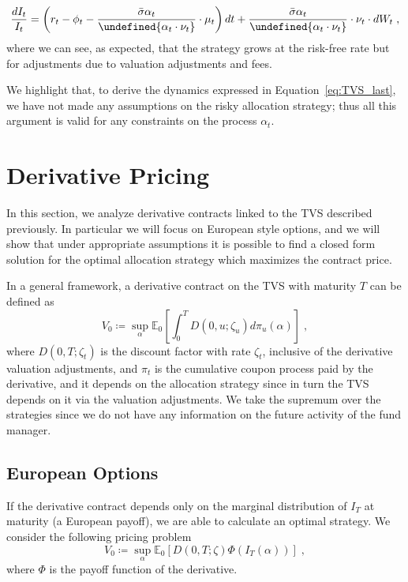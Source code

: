 \documentclass[11pt]{article}
\let\norm\undefined %
\DeclarePairedDelimiter\norm{\lVert}{\rVert}
\begin{document}
\begin{equation}
     \frac{dI_t}{I_t} = \left(r_t -  \phi_t     - \frac{\bar{\sigma} \alpha_t}{\norm {\alpha_t \cdot \nu_t }}  \cdot \mu_t \right)dt+ \frac{\bar{\sigma}\alpha_t }{\norm{ \alpha_t \cdot \nu_t }} \cdot \nu_t \cdot dW_t \; ,
\label{eq:TVS_last}\end{equation}
where we can see, as expected, that the strategy grows at the risk-free rate but for adjustments due to valuation adjustments and fees.

We highlight that, to derive the dynamics expressed in Equation~\eqref{eq:TVS_last}, we have not made any assumptions on the risky allocation strategy; thus all this argument is valid for any constraints on the process $\alpha_t$.


\section{Derivative Pricing}\label{sec:Derivative}
In this section, we analyze derivative contracts linked to the TVS described previously. In particular we will focus on European style options, and we will show that under appropriate assumptions it is possible to find a closed form solution for the optimal allocation strategy which maximizes the contract price.

In a general framework, a derivative contract on the TVS with maturity $T$ can be defined as
\begin{equation}
    V_0 \coloneqq \sup_\alpha \mathbb{E}_0\left[\int_0^T D(0,u;\zeta_u)d\pi_u(\alpha)\right] \; ,
\end{equation}
where $D(0,T;\zeta_t)$ is the discount factor with rate $\zeta_t$, inclusive of the derivative valuation adjustments, and $\pi_t$ is the cumulative coupon process paid by the derivative, and it depends on the allocation strategy since in turn the TVS depends on it via the valuation adjustments. We take the supremum over the strategies since we do not have any information on the future activity of the fund manager.


\subsection{European Options}
If the derivative contract depends only on the marginal distribution of $I_T$ at maturity (a European payoff), we are able to calculate an optimal strategy. We consider the following pricing problem
\begin{equation}
    V_0 \coloneqq \sup_\alpha \mathbb{E}_0\left[D(0,T;\zeta)\Phi(I_T(\alpha))\right] \; ,
\end{equation}
where $\Phi$ is the payoff function of the derivative. 
\end{document}
